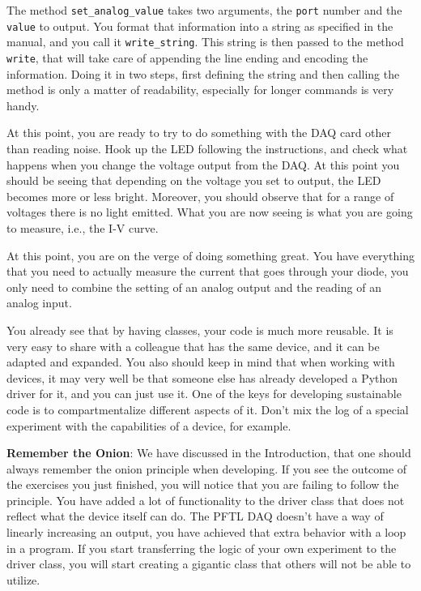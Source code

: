 The method \texttt{set\_analog\_value} takes two arguments, the
\texttt{port} number and the \texttt{value} to output. You format that
information into a string as specified in the manual, and you call it
\texttt{write\_string}. This string is then passed to the method
\texttt{write}, that will take care of appending the line ending and
encoding the information. Doing it in two steps, first defining the
string and then calling the method is only a matter of readability,
especially for longer commands is very handy.

At this point, you are ready to try to do something with the {DAQ} card
other than reading noise. Hook up the {LED} following the instructions,
and check what happens when you change the voltage output from the
{DAQ}. At this point you should be seeing that depending on the voltage
you set to output, the {LED} becomes more or less bright. Moreover, you
should observe that for a range of voltages there is no light emitted.
What you are now seeing is what you are going to measure, i.e., the
I-V curve.

At this point, you are on the verge of doing something great. You have
everything that you need to actually measure the current that goes
through your diode, you only need to combine the setting of an analog
output and the reading of an analog input.




You already see that by having classes, your code is much more reusable.
It is very easy to share with a colleague that has the same device, and
it can be adapted and expanded. You also should keep in mind that when
working with devices, it may very well be that someone else has already
developed a Python driver for it, and you can just use it. One of the
keys for developing sustainable code is to compartmentalize different
aspects of it. Don't mix the log of a special experiment with the
capabilities of a device, for example.

\textbf{Remember the Onion}: We have discussed in the Introduction, that
one should always remember the onion principle when developing. If you
see the outcome of the exercises you just finished, you will notice that
you are failing to follow the principle. You have added a lot of
functionality to the driver class that does not reflect what the device
itself can do. The {PFTL} {DAQ} doesn't have a way of linearly
increasing an output, you have achieved that extra behavior with a loop
in a program. If you start transferring the logic of your own experiment
to the driver class, you will start creating a gigantic class that
others will not be able to utilize.

